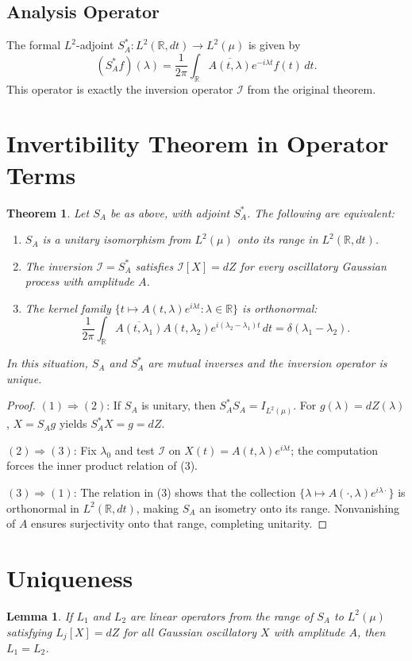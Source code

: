 \documentclass[12pt]{article}
\theoremstyle{plain}
\newtheorem{theorem}{Theorem}
\newtheorem{lemma}{Lemma}
\begin{document}
\subsection{Analysis Operator}
The formal $L^2$-adjoint $S_A^* : L^2(\mathbb{R},dt) \to L^2(\mu)$ is given by
\[
(S_A^* f)(\lambda) = \frac{1}{2\pi} \int_{\mathbb{R}} \overline{A(t,\lambda)} e^{-i\lambda t} f(t)\, dt.
\]
This operator is exactly the inversion operator $\mathcal{I}$ from the original theorem.

\section{Invertibility Theorem in Operator Terms}
\begin{theorem}
Let $S_A$ be as above, with adjoint $S_A^*$. The following are equivalent:
\begin{enumerate}
\item $S_A$ is a unitary isomorphism from $L^2(\mu)$ onto its range in $L^2(\mathbb{R},dt)$.
\item The inversion $\mathcal{I} = S_A^*$ satisfies $\mathcal{I}[X] = dZ$ for every oscillatory Gaussian process with amplitude $A$.
\item The kernel family $\{t \mapsto A(t,\lambda)e^{i\lambda t}:\lambda \in \mathbb{R}\}$ is orthonormal:
\[
\frac{1}{2\pi} \int_{\mathbb{R}} \overline{A(t,\lambda_1)} A(t,\lambda_2) e^{i(\lambda_2 - \lambda_1)t}\, dt
= \delta(\lambda_1 - \lambda_2).
\]
\end{enumerate}
In this situation, $S_A$ and $S_A^*$ are mutual inverses and the inversion operator is unique.
\end{theorem}

\begin{proof}
$(1) \Rightarrow (2)$: If $S_A$ is unitary, then $S_A^* S_A = I_{L^2(\mu)}$. For $g(\lambda) = dZ(\lambda)$, $X = S_A g$ yields $S_A^* X = g = dZ$.

$(2) \Rightarrow (3)$: Fix $\lambda_0$ and test $\mathcal{I}$ on $X(t) = A(t,\lambda) e^{i\lambda t}$; the computation forces the inner product relation of (3).

$(3) \Rightarrow (1)$: The relation in (3) shows that the collection $\{\lambda \mapsto A(\cdot,\lambda)e^{i\lambda \cdot}\}$ is orthonormal in $L^2(\mathbb{R},dt)$, making $S_A$ an isometry onto its range. Nonvanishing of $A$ ensures surjectivity onto that range, completing unitarity.
\end{proof}

\section{Uniqueness}
\begin{lemma}
If $L_1$ and $L_2$ are linear operators from the range of $S_A$ to $L^2(\mu)$ satisfying $L_j[X] = dZ$ for all Gaussian oscillatory $X$ with amplitude $A$, then $L_1 = L_2$.
\end{lemma}
\end{document}
